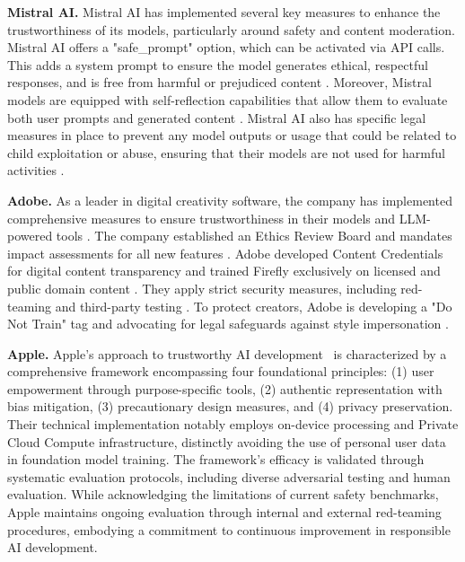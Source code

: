 \textbf{Mistral AI.} Mistral AI has implemented several key measures to enhance the trustworthiness of its models, particularly around safety and content moderation. Mistral AI offers a "safe\_prompt" option, which can be activated via API calls. This adds a system prompt to ensure the model generates ethical, respectful responses, and is free from harmful or prejudiced content \cite{mistral_guardrailing}. Moreover, Mistral models are equipped with self-reflection capabilities that allow them to evaluate both user prompts and generated content \cite{jiang2023mistral}. Mistral AI also has specific legal measures in place to prevent any model outputs or usage that could be related to child exploitation or abuse, ensuring that their models are not used for harmful activities \cite{mistral_child_abuse}.

\textbf{Adobe.} As a leader in digital creativity software, the company has implemented comprehensive measures to ensure trustworthiness in their models and LLM-powered tools \cite{adobe_ai_commitments}. The company established an Ethics Review Board and mandates impact assessments for all new features \cite{adobe_ai_ethics}. Adobe developed Content Credentials for digital content transparency and trained Firefly \cite{adobe_firefly} exclusively on licensed and public domain content \cite{adobe_ai_commitments}. They apply strict security measures, including red-teaming and third-party testing \cite{adobe_trust_center}. To protect creators, Adobe is developing a "Do Not Train" tag and advocating for legal safeguards against style impersonation \cite{adobe_fair_act}.

\textbf{Apple.} Apple's approach to trustworthy AI development~\cite{gunter2024apple} is characterized by a comprehensive framework encompassing four foundational principles: (1) user empowerment through purpose-specific tools, (2) authentic representation with bias mitigation, (3) precautionary design measures, and (4) privacy preservation. Their technical implementation notably employs on-device processing and Private Cloud Compute infrastructure, distinctly avoiding the use of personal user data in foundation model training. The framework's efficacy is validated through systematic evaluation protocols, including diverse adversarial testing and human evaluation. While acknowledging the limitations of current safety benchmarks, Apple maintains ongoing evaluation through internal and external red-teaming procedures, embodying a commitment to continuous improvement in responsible AI development.

